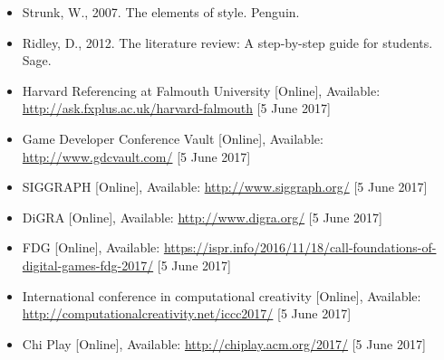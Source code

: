 \documentclass{../../fal_assignment}
\begin{document}
\begin{itemize}
     \item Strunk, W., 2007. The elements of style. Penguin.
     \item Ridley, D., 2012. The literature review: A step-by-step guide for students. Sage.
     \item Harvard Referencing at Falmouth University [Online], Available: \url{http://ask.fxplus.ac.uk/harvard-falmouth} [5 June 2017]
     \item Game Developer Conference Vault [Online], Available: \url{http://www.gdcvault.com/} [5 June 2017]
     \item SIGGRAPH [Online], Available: \url{http://www.siggraph.org/}  [5 June 2017]
     \item DiGRA [Online], Available: \url{http://www.digra.org/}  [5 June 2017]
     \item FDG [Online], Available: \url{https://ispr.info/2016/11/18/call-foundations-of-digital-games-fdg-2017/}  [5 June 2017]
     \item International conference in computational creativity [Online], Available: \url{http://computationalcreativity.net/iccc2017/}  [5 June 2017]
     \item Chi Play [Online], Available: \url{http://chiplay.acm.org/2017/}  [5 June 2017]
     
    
\end{itemize}
\end{document}
